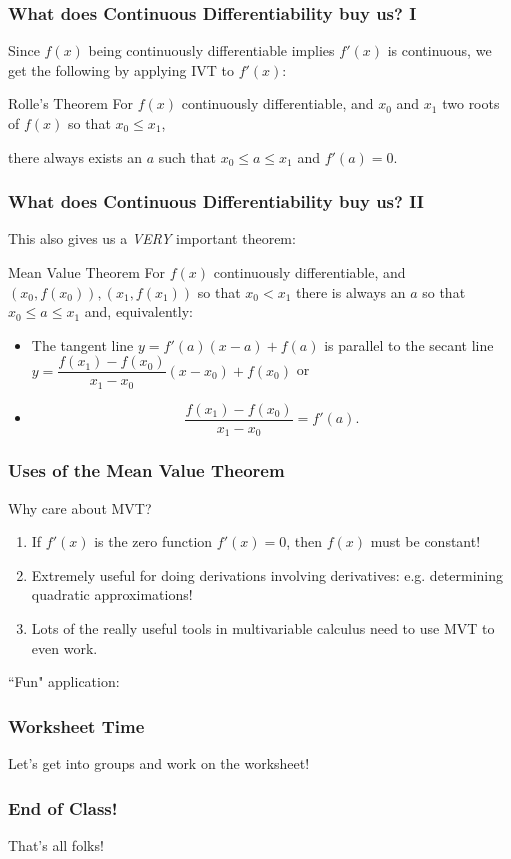 \documentclass{ltx-talk}
\begin{document}
\begin{frame}
  \frametitle{What does Continuous Differentiability buy us? I}
  Since $f(x)$ being continuously differentiable implies $f'(x)$ is continuous, we get the following by applying IVT to $f'(x)$: \pause
  \begin{alertblock}{Rolle's Theorem}
    For $f(x)$ continuously differentiable, and $x_0$ and $x_1$ two roots of $f(x)$ so that $x_0 \leq x_1$, \pause

    there always exists an $a$ such that $x_0 \leq a \leq x_1$ and $f'(a) = 0$.
  \end{alertblock}
  \vfill
\end{frame}
\begin{frame}
  \frametitle{What does Continuous Differentiability buy us? II}
  This also gives us a \textit{VERY} important theorem: \pause
  \begin{alertblock}{Mean Value Theorem}
    For $f(x)$ continuously differentiable, and $(x_0, f(x_0)), (x_1, f(x_1))$ so that $x_0 < x_1$ there is always an $a$ so that $x_0 \leq a \leq x_1$ and, equivalently: \pause
    \begin{itemize}
    \item The tangent line $y = f'(a)(x - a) + f(a)$ is parallel to the secant line $y = \dfrac{f(x_1) - f(x_0)}{x_1 - x_0}(x - x_0) + f(x_0)$ or \pause
    \item 
      \begin{equation}
        \dfrac{f(x_1) - f(x_0)}{x_1 - x_0} = f'(a).
      \end{equation}
    \end{itemize}
  \end{alertblock}
\end{frame}

\begin{frame}
  \frametitle{Uses of the Mean Value Theorem}

  \vfill
  Why care about MVT? \pause

  \begin{enumerate}
    \item If $f'(x)$ is the zero function $f'(x) = 0$, then $f(x)$ must be constant! \pause
    \vfill
    \item Extremely useful for doing derivations involving derivatives: e.g. determining quadratic approximations! \pause
    \vfill
  \item Lots of the really useful tools in multivariable calculus need to use MVT to even work.
    \vfill
  \end{enumerate}

  ``Fun" application: 
  \vfill
\end{frame}

\begin{frame}
  \frametitle{Worksheet Time}

  Let's get into groups and work on the worksheet!
\end{frame}

\begin{frame}
  \frametitle{End of Class!}

  That's all folks!
\end{frame}
\end{document}
